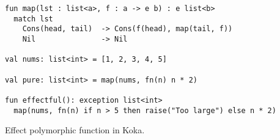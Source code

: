 \begin{algorithm}

\begin{verbatim}
fun map(lst : list<a>, f : a -> e b) : e list<b>
  match lst
    Cons(head, tail)  -> Cons(f(head), map(tail, f))
    Nil               -> Nil

val nums: list<int> = [1, 2, 3, 4, 5]

val pure: list<int> = map(nums, fn(n) n * 2)

fun effectful(): exception list<int>
  map(nums, fn(n) if n > 5 then raise("Too large") else n * 2)
\end{verbatim}

\caption{Effect polymorphic  function in Koka. \label{alg-eff:polymorphism-koka}}
\end{algorithm}